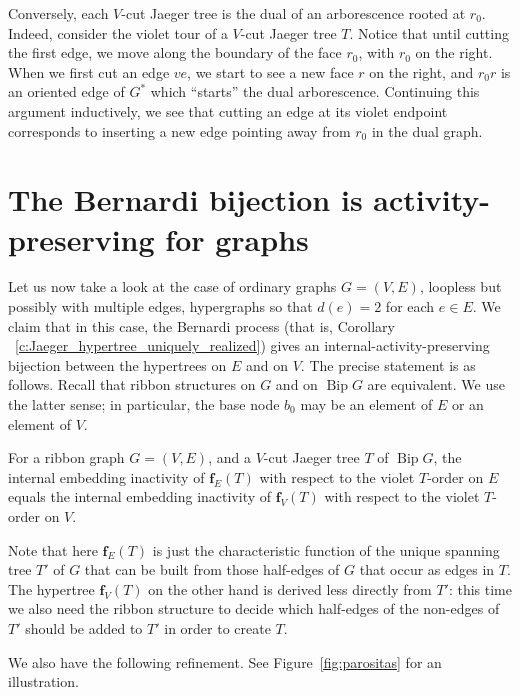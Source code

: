 \documentclass[ALCO,ThmDefs,Unicode,epreuves]{cedram}
\DeclareMathOperator{\bip}{Bip}
\begin{document}
Conversely, each $V$-cut Jaeger tree is the dual of an arborescence rooted at $r_0$. Indeed, consider the violet tour of a $V$-cut Jaeger tree $T$. Notice that until cutting the first edge, we move along the boundary of the face $r_0$, with $r_0$ on the right. When we first cut an edge $ve$, we start to see a new face $r$ on the right, and $r_0r$ is an oriented edge of $G^*$ which ``starts'' the dual arborescence. Continuing this argument inductively, we see that cutting an edge at its violet endpoint corresponds to inserting a new edge pointing away from $r_0$ in the dual graph.



\appendix

\section{The Bernardi bijection is activity-preserving for graphs} \label{sec:act_preserv_for_graphs}

Let us now take a look at the case of ordinary graphs $G=(V,E)$, loopless but possibly with multiple edges, \ie hypergraphs so that $d(e)=2$ for each $e\in E$. We claim that in this case, the Bernardi process (that is, Corollary ~\ref{c:Jaeger_hypertree_uniquely_realized}) gives an internal-activity-preserving bijection between the hypertrees on $E$ and on $V$. The precise statement is as follows. Recall that ribbon structures on $G$ and on $\bip G$ are equivalent. We use the latter sense; in particular, the base node $b_0$ may be an element of $E$ or an element of $V$.

\begin{theo}\label{thm:Bernardi_activity_preserving_graph}
For a ribbon graph $G=(V,E)$, and a $V$-cut Jaeger tree $T$ of $\bip G$, the internal embedding inactivity of $\mathbf f_E(T)$ with respect to the violet $T$-order on $E$ equals the internal embedding inactivity of $\mathbf f_V(T)$ with respect to the violet $T$-order on $V$. 
\end{theo}

Note that here $\mathbf f_E(T)$ is just the characteristic function of the unique spanning tree $T'$ of $G$ that can be built from those half-edges of $G$ that occur as edges in $T$. The hypertree $\mathbf f_V(T)$ on the other hand is derived less directly from $T'$: this time we also need the ribbon structure to decide which half-edges of the non-edges of $T'$ should be added to $T'$ in order to create $T$. 

We also have the following refinement. See Figure~\ref{fig:parositas} for an illustration.
\end{document}
